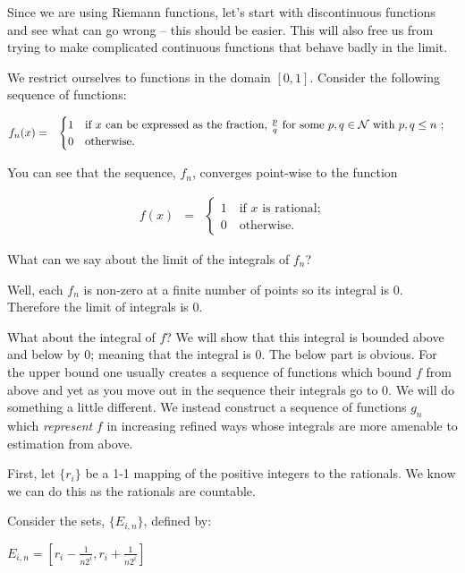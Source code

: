 \documentclass{article}
\begin{document}
Since we are using Riemann functions, 
let's start with discontinuous functions 
and see what can go wrong -- this should be easier. This will also free us from 
trying to make complicated continuous functions that behave badly in the limit.

We restrict ourselves to functions in the domain $[0, 1]$.
Consider the following sequence of functions: 

\begin{eqnarray}
	f_n(x) & = & \begin{cases}  1 \quad \text{if $x$ can be expressed as the fraction, $\frac{p}{q}$ for some $p, q \in {\cal N}$ with $p, q \le n$ ;} \\ 
	  			        		0 \quad \text{otherwise.} 
			   	 \end{cases}
\end{eqnarray}

You can see that the sequence, $f_n$, converges point-wise to the function 

\begin{eqnarray}
	f(x) & = & \begin{cases} 1 \quad \text{if $x$ is rational;} \\ 
			                 0 \quad \text{otherwise.} 
			   \end{cases}
\end{eqnarray}

What can we say about the limit of the integrals of $f_n$?

Well, each $f_n$ is non-zero at a finite number of points so its integral is $0$.
Therefore the limit of integrals is $0$.

What about the integral of $f$? We will show that this integral is bounded above
and below by $0$; meaning that the integral is $0$. The below part is obvious. 
For the upper bound one usually creates a sequence of functions which bound $f$ 
from above and yet as you move out in the sequence their integrals go to $0$.
We will do something a little different. We instead  
construct a sequence of functions $g_n$ which {\em represent\/} $f$ 
in increasing refined ways whose integrals are more amenable to estimation from above.

First, let $\{r_i\}$ be a 1-1 mapping of the positive integers to the rationals.
We know we can do this as the rationals are countable. 

Consider the sets, $\{E_{i,n}\}$, defined by:

$E_{i,n} = \left[r_i - \frac{1}{n 2^{i}}, r_i + \frac{1}{n 2^{i}}\right]$
\end{document}
